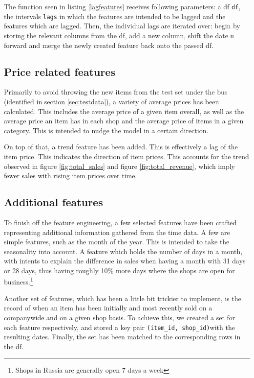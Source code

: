 

The function seen in listing \ref{lagfeatures} receives following parameters: a \gls{df} \texttt{df}, the intervals \texttt{lags} in which the features are intended to be lagged and the features which are lagged. Then, the individual lags are iterated over: begin by storing the relevant columns from the \gls{df}, add a new column, shift the date \texttt{n} forward and merge the newly created feature back onto the passed \gls{df}.


\subsection{Price related features}

Primarily to avoid throwing the new items from the test set under the bus (identified in section \ref{sec:testdata}), a variety of average prices has been calculated. This includes the average price of a given item overall, as well as the average price an item has in each shop and the average price of items in a given category.
This is intended to nudge the model in a certain direction.

On top of that, a trend feature has been added. This is effectively a lag of the item price. 
This indicates the direction of item prices. This accounts for the trend observed in figure \ref{fig:total_sales} and figure \ref{fig:total_revenue}, which imply fewer sales with rising item prices over time.

\subsection{Additional features}

To finish off the feature engineering, a few selected features have been crafted representing additional information gathered from the time data. A few are simple features, such as the month of the year. This is intended to take the seasonality into account. A feature which holds the number of days in a month, with intents to explain the difference in sales when having a month with 31 days or 28 days, thus having roughly 10\% more days where the shops are open for business.\footnote{Shops in Russia are generally open 7 days a week}

Another set of features, which has been a little bit trickier to implement, is the record of when an item has been initially and most recently sold on a companywide and on a given shop basis.
To achieve this, we created a set for each feature respectively, and stored a key pair \texttt{(item\_id, shop\_id)}with the resulting dates. Finally, the set has been matched to the corresponding rows in the \gls{df}.
